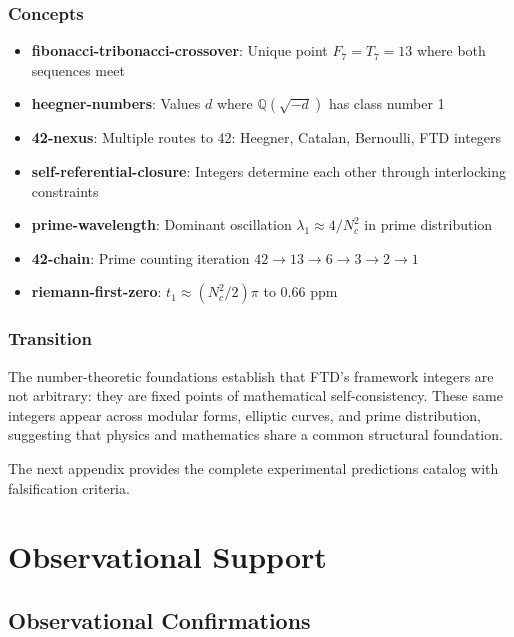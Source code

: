 \documentclass[
  11pt,
  letterpaper,
  twoside,
  openright]{book}
\providecommand{\tightlist}{%
  \setlength{\itemsep}{0pt}\setlength{\parskip}{0pt}}
\begin{document}
\section{Concepts}\label{concepts-47}

\begin{itemize}
\tightlist
\item
  \textbf{fibonacci-tribonacci-crossover}: Unique point
  \(F_7 = T_7 = 13\) where both sequences meet
\item
  \textbf{heegner-numbers}: Values \(d\) where \(\mathbb{Q}(\sqrt{-d})\)
  has class number 1
\item
  \textbf{42-nexus}: Multiple routes to 42: Heegner, Catalan, Bernoulli,
  FTD integers
\item
  \textbf{self-referential-closure}: Integers determine each other
  through interlocking constraints
\item
  \textbf{prime-wavelength}: Dominant oscillation
  \(\lambda_1 \approx 4/N_c^2\) in prime distribution
\item
  \textbf{42-chain}: Prime counting iteration
  \(42 \to 13 \to 6 \to 3 \to 2 \to 1\)
\item
  \textbf{riemann-first-zero}: \(t_1 \approx (N_c^2/2)\pi\) to 0.66 ppm
\end{itemize}

\section{Transition}\label{transition-47}

The number-theoretic foundations establish that FTD's framework integers
are not arbitrary: they are fixed points of mathematical
self-consistency. These same integers appear across modular forms,
elliptic curves, and prime distribution, suggesting that physics and
mathematics share a common structural foundation.

The next appendix provides the complete experimental predictions catalog
with falsification criteria.

\part{Observational Support}

\chapter{Observational Confirmations}\label{sec-obs-confirm}
\end{document}
